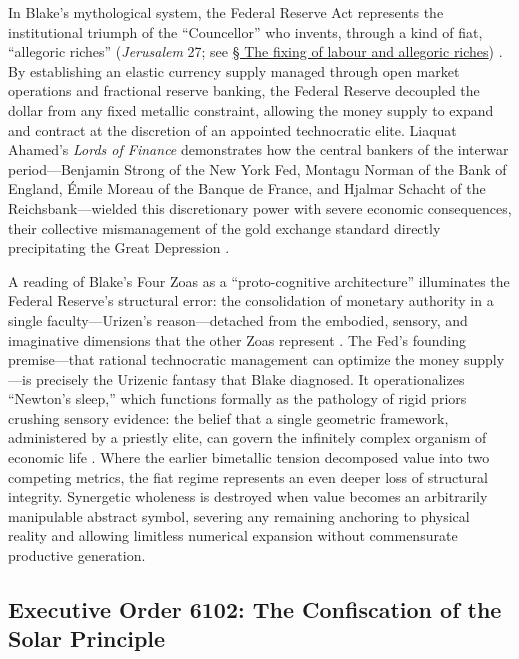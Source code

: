 \documentclass[
]{article}
\begin{document}
In Blake's mythological system, the Federal Reserve Act represents the
institutional triumph of the ``Councellor'' who invents, through a kind
of fiat, ``allegoric riches'' (\emph{Jerusalem} 27; see
\hyperref[sec-allegoric-riches]{§ The fixing of labour and allegoric
riches}) \citep{erdman1988complete}. By establishing an elastic currency
supply managed through open market operations and fractional reserve
banking, the Federal Reserve decoupled the dollar from any fixed
metallic constraint, allowing the money supply to expand and contract at
the discretion of an appointed technocratic elite. Liaquat Ahamed's
\emph{Lords of Finance} demonstrates how the central bankers of the
interwar period---Benjamin Strong of the New York Fed, Montagu Norman of
the Bank of England, Émile Moreau of the Banque de France, and Hjalmar
Schacht of the Reichsbank---wielded this discretionary power with severe
economic consequences, their collective mismanagement of the gold
exchange standard directly precipitating the Great Depression
\citep{ahamed2009lords}.

A reading of Blake's Four Zoas as a ``proto-cognitive architecture''
illuminates the Federal Reserve's structural error: the consolidation of
monetary authority in a single faculty---Urizen's reason---detached from
the embodied, sensory, and imaginative dimensions that the other Zoas
represent \citep{friedman2026blake}. The Fed's founding premise---that
rational technocratic management can optimize the money supply---is
precisely the Urizenic fantasy that Blake diagnosed. It operationalizes
``Newton's sleep,'' which functions formally as the pathology of rigid
priors crushing sensory evidence: the belief that a single geometric
framework, administered by a priestly elite, can govern the infinitely
complex organism of economic life \citep{friedman2026doors}. Where the
earlier bimetallic tension decomposed value into two competing metrics,
the fiat regime represents an even deeper loss of structural integrity.
Synergetic wholeness is destroyed when value becomes an arbitrarily
manipulable abstract symbol, severing any remaining anchoring to
physical reality and allowing limitless numerical expansion without
commensurate productive generation.

\subsection{Executive Order 6102: The Confiscation of the Solar
Principle}\label{executive-order-6102-the-confiscation-of-the-solar-principle}
\end{document}
